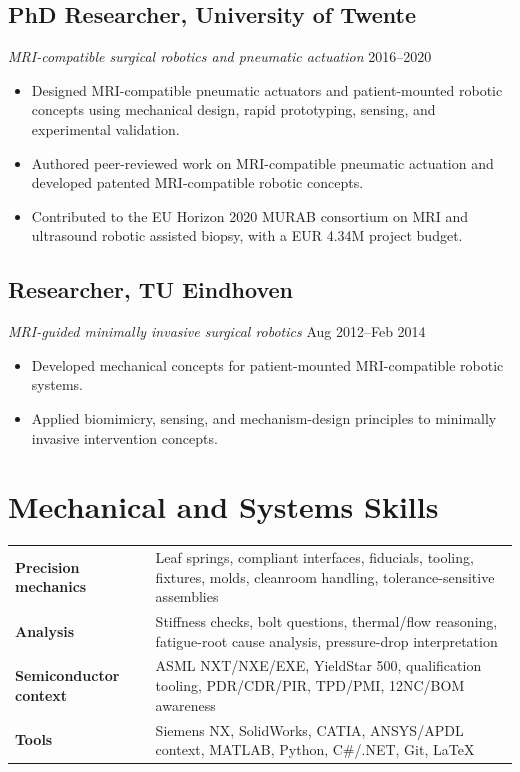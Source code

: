 \documentclass[11pt,a4paper]{article}
\begin{document}
\subsection{PhD Researcher, University of Twente}
{\small\textit{MRI-compatible surgical robotics and pneumatic actuation}} \hfill {\small 2016--2020}
\begin{itemize}
 \item Designed MRI-compatible pneumatic actuators and patient-mounted robotic concepts using mechanical design, rapid prototyping, sensing, and experimental validation.
 \item Authored peer-reviewed work on MRI-compatible pneumatic actuation and developed patented MRI-compatible robotic concepts.
 \item Contributed to the EU Horizon 2020 MURAB consortium on MRI and ultrasound robotic assisted biopsy, with a EUR 4.34M project budget.
\end{itemize}

\subsection{Researcher, TU Eindhoven}
{\small\textit{MRI-guided minimally invasive surgical robotics}} \hfill {\small Aug 2012--Feb 2014}
\begin{itemize}
 \item Developed mechanical concepts for patient-mounted MRI-compatible robotic systems.
 \item Applied biomimicry, sensing, and mechanism-design principles to minimally invasive intervention concepts.
\end{itemize}

\section{Mechanical and Systems Skills}

\begin{tabularx}{\textwidth}{@{}lX@{}}
\textbf{Precision mechanics} & Leaf springs, compliant interfaces, fiducials, tooling, fixtures, molds, cleanroom handling, tolerance-sensitive assemblies \\
\textbf{Analysis} & Stiffness checks, bolt questions, thermal/flow reasoning, fatigue-root cause analysis, pressure-drop interpretation \\
\textbf{Semiconductor context} & ASML NXT/NXE/EXE, YieldStar 500, qualification tooling, PDR/CDR/PIR, TPD/PMI, 12NC/BOM awareness \\
\textbf{Tools} & Siemens NX, SolidWorks, CATIA, ANSYS/APDL context, MATLAB, Python, C\#/.NET, Git, \LaTeX \\
\end{tabularx}
\end{document}
